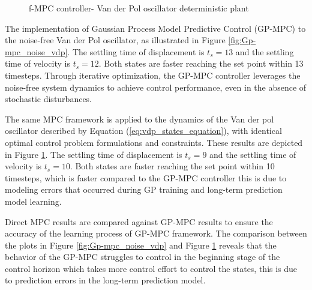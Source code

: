 \begin{figure}
    \centering
    
    \caption{f-MPC controller- Van der Pol oscillator deterministic plant}
    \label{fig:f-mpc_noise_vdp}
\end{figure}

The implementation of Gaussian Process Model Predictive Control (GP-MPC) to the noise-free Van der Pol oscillator, as illustrated in Figure \ref{fig:Gp-mpc_noise_vdp}. The settling time of displacement is $t_s=13$ and the settling time of velocity is $t_s=12$. Both states are faster reaching the set point within 13 timesteps. Through iterative optimization, the GP-MPC controller leverages the noise-free system dynamics to achieve control performance, even in the absence of stochastic disturbances.


The same MPC framework is applied to the dynamics of the Van der pol oscillator described by Equation (\ref{eq:vdp_states_equation}), with identical optimal control problem formulations and constraints. These results are depicted in Figure \ref{fig:f-mpc_noise_vdp}. The settling time of displacement is $t_s=9$ and the settling time of velocity is $t_s=10$. Both states are faster reaching the set point within 10 timesteps, which is faster compared to the GP-MPC controller this is due to modeling errors that occurred during GP training and long-term prediction model learning. 

Direct MPC results are compared against GP-MPC results to ensure the accuracy of the learning process of GP-MPC framework. The comparison between the plots in Figure \ref{fig:Gp-mpc_noise_vdp} and Figure \ref{fig:f-mpc_noise_vdp} reveals that the behavior of the GP-MPC struggles to control in the beginning stage of the control horizon which takes more control effort to control the states, this is due to prediction errors in the long-term prediction model. 










